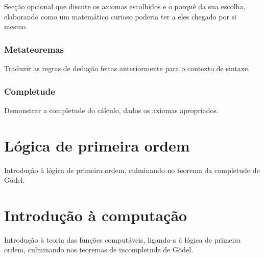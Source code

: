 \documentclass{report}
\theoremstyle{definition}
\theoremstyle{remark}
\begin{document}
	Secção opcional que discute os axiomas escolhidos e o porquê da sua escolha, elaborando como um matemático curioso poderia ter a eles chegado por si mesmo.
	
	\subsection{Metateoremas}
	
	Traduzir as regras de dedução feitas anteriormente para o contexto de sintaxe.
	
	\subsection{Completude}
	
	Demonstrar a completude do cálculo, dados os axiomas apropriados.
	
	\chapter{Lógica de primeira ordem}
	
	Introdução à lógica de primeira ordem, culminando no teorema da completude de Gödel.
	
	\chapter{Introdução à computação}
	
	Introdução à teoria das funções computáveis, ligando-a à lógica de primeira ordem, culminando nos teoremas de incompletude de Gödel.
	
\end{document}
